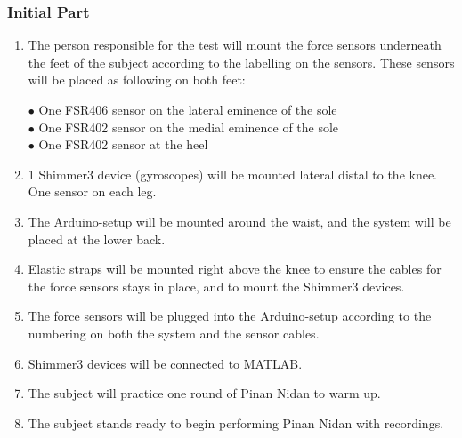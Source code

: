 \subsubsection{Initial Part}
\begin{enumerate}
\item The person responsible for the test will mount the force sensors underneath the feet of the subject according to the labelling on the sensors. These sensors will be placed as following on both feet:
\begin{itemize}
$\bullet$ One FSR406 sensor on the lateral eminence of the sole \\
$\bullet$ One FSR402 sensor on the medial eminence of the sole \\
$\bullet$ One FSR402 sensor at the heel \\
\end{itemize}
\item 1 Shimmer3 device (gyroscopes) will be mounted lateral distal to the knee. One sensor on each leg.
\item The Arduino-setup will be mounted around the waist, and the system will be placed at the lower back.
\item Elastic straps will be mounted right above the knee to ensure the cables for the force sensors stays in place, and to mount the Shimmer3 devices.
\item The force sensors will be plugged into the Arduino-setup according to the numbering on both the system and the sensor cables.
\item Shimmer3 devices will be connected to MATLAB.
\item The subject will practice one round of Pinan Nidan to warm up.
\item The subject stands ready to begin performing Pinan Nidan with recordings.
\end{enumerate}

